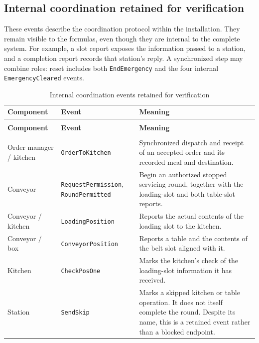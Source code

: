 \documentclass[11pt,a4paper]{article}
\renewcommand{\arraystretch}{1.14}
\begin{document}
\subsection{Internal coordination retained for verification}

These events describe the coordination protocol within the installation. They remain visible to the formulas, even though they are internal to the complete system. For example, a slot report exposes the information passed to a station, and a completion report records that station's reply. A synchronized step may combine roles: reset includes both \texttt{EndEmergency} and the four internal \texttt{EmergencyCleared} events.

\begingroup
\small
\setlength{\tabcolsep}{4pt}
\renewcommand{\arraystretch}{1.13}
\begin{longtable}{@{}>{\raggedright\arraybackslash}p{}>{\raggedright\arraybackslash}p{}>{\raggedright\arraybackslash}p{}@{}}
\caption{Internal coordination events retained for verification}\label{tab:coordination-actions}\\
\toprule
\textbf{Component} & \textbf{Event} & \textbf{Meaning} \\
\midrule
\endfirsthead
\multicolumn{3}{@{}l}{\small Internal coordination events (continued)}\\
\toprule
\textbf{Component} & \textbf{Event} & \textbf{Meaning} \\
\midrule
\endhead
\midrule
\multicolumn{3}{r@{}}{\small Continued on next page}\\
\endfoot
\bottomrule
\endlastfoot
Order manager / kitchen & \texttt{OrderToKitchen} & Synchronized dispatch and receipt of an accepted order and its recorded meal and destination. \\
Conveyor & \texttt{RequestPermission}, \texttt{RoundPermitted} & Begin an authorized stopped servicing round, together with the loading-slot and both table-slot reports. \\
Conveyor / kitchen & \texttt{LoadingPosition} & Reports the actual contents of the loading slot to the kitchen. \\
Conveyor / box & \texttt{ConveyorPosition} & Reports a table and the contents of the belt slot aligned with it. \\
Kitchen & \texttt{CheckPosOne} & Marks the kitchen's check of the loading-slot information it has received. \\
Station & \texttt{SendSkip} & Marks a skipped kitchen or table operation. It does not itself complete the round. Despite its name, this is a retained event rather than a blocked endpoint. \\

\end{longtable}
\end{document}
